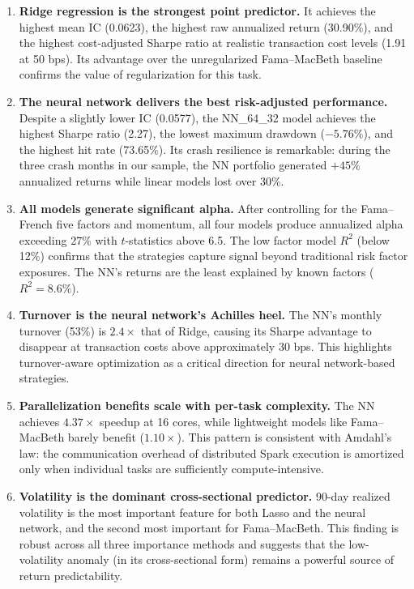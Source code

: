 \documentclass[11pt]{article}
\begin{document}
\begin{enumerate}
    \item \textbf{Ridge regression is the strongest point predictor.} It achieves the highest mean IC (0.0623), the highest raw annualized return (30.90\%), and the highest cost-adjusted Sharpe ratio at realistic transaction cost levels (1.91 at 50 bps). Its advantage over the unregularized Fama--MacBeth baseline confirms the value of regularization for this task.

    \item \textbf{The neural network delivers the best risk-adjusted performance.} Despite a slightly lower IC (0.0577), the NN\_64\_32 model achieves the highest Sharpe ratio (2.27), the lowest maximum drawdown ($-5.76\%$), and the highest hit rate (73.65\%). Its crash resilience is remarkable: during the three crash months in our sample, the NN portfolio generated $+45\%$ annualized returns while linear models lost over 30\%.

    \item \textbf{All models generate significant alpha.} After controlling for the Fama--French five factors and momentum, all four models produce annualized alpha exceeding 27\% with $t$-statistics above 6.5. The low factor model $R^2$ (below 12\%) confirms that the strategies capture signal beyond traditional risk factor exposures. The NN's returns are the least explained by known factors ($R^2 = 8.6\%$).

    \item \textbf{Turnover is the neural network's Achilles heel.} The NN's monthly turnover (53\%) is $2.4\times$ that of Ridge, causing its Sharpe advantage to disappear at transaction costs above approximately 30 bps. This highlights turnover-aware optimization as a critical direction for neural network-based strategies.

    \item \textbf{Parallelization benefits scale with per-task complexity.} The NN achieves $4.37\times$ speedup at 16 cores, while lightweight models like Fama--MacBeth barely benefit ($1.10\times$). This pattern is consistent with Amdahl's law: the communication overhead of distributed Spark execution is amortized only when individual tasks are sufficiently compute-intensive.

    \item \textbf{Volatility is the dominant cross-sectional predictor.} 90-day realized volatility is the most important feature for both Lasso and the neural network, and the second most important for Fama--MacBeth. This finding is robust across all three importance methods and suggests that the low-volatility anomaly (in its cross-sectional form) remains a powerful source of return predictability.
\end{enumerate}
\end{document}
